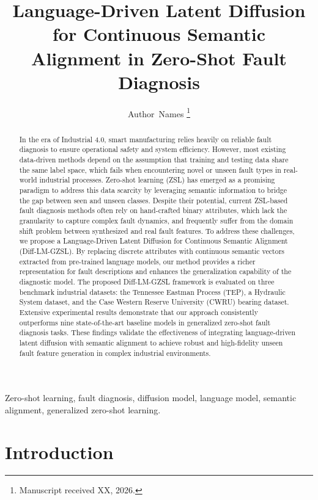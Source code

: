 \documentclass[journal]{IEEEtran}
\title{Language-Driven Latent Diffusion for Continuous Semantic Alignment in Zero-Shot Fault Diagnosis}
\author{Author~Names
\thanks{Manuscript received XX, 2026.}}
\begin{document}
\maketitle

\begin{abstract}
In the era of Industrial 4.0, smart manufacturing relies heavily on reliable fault diagnosis to ensure operational safety and system efficiency. However, most existing data-driven methods depend on the assumption that training and testing data share the same label space, which fails when encountering novel or unseen fault types in real-world industrial processes. Zero-shot learning (ZSL) has emerged as a promising paradigm to address this data scarcity by leveraging semantic information to bridge the gap between seen and unseen classes. Despite their potential, current ZSL-based fault diagnosis methods often rely on hand-crafted binary attributes, which lack the granularity to capture complex fault dynamics, and frequently suffer from the domain shift problem between synthesized and real fault features. To address these challenges, we propose a Language-Driven Latent Diffusion for Continuous Semantic Alignment (Diff-LM-GZSL). By replacing discrete attributes with continuous semantic vectors extracted from pre-trained language models, our method provides a richer representation for fault descriptions and enhances the generalization capability of the diagnostic model. The proposed Diff-LM-GZSL framework is evaluated on three benchmark industrial datasets: the Tennessee Eastman Process (TEP), a Hydraulic System dataset, and the Case Western Reserve University (CWRU) bearing dataset. Extensive experimental results demonstrate that our approach consistently outperforms nine state-of-the-art baseline models in generalized zero-shot fault diagnosis tasks. These findings validate the effectiveness of integrating language-driven latent diffusion with semantic alignment to achieve robust and high-fidelity unseen fault feature generation in complex industrial environments.
\end{abstract}

\begin{IEEEkeywords}
Zero-shot learning, fault diagnosis, diffusion model, language model, semantic alignment, generalized zero-shot learning.
\end{IEEEkeywords}

\section{Introduction}
\end{document}
